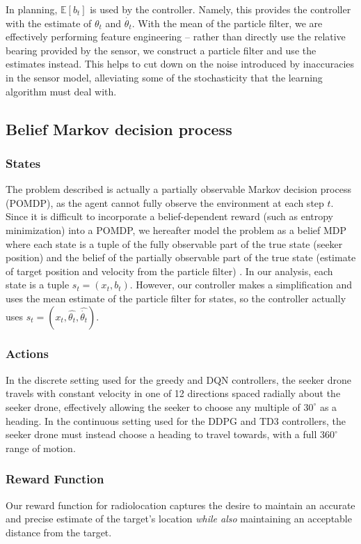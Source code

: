 \documentclass[10pt,twocolumn,letterpaper]{article}
\begin{document}
In planning, $\mathbb{E}\left [ b_t \right ]$ is used by the controller. 
Namely, this provides the controller with the estimate of $\theta_t$ and $\dot{\theta_t}$.
With the mean of the particle filter, we are effectively performing feature engineering -- rather than directly use the relative bearing provided by the sensor, we construct a particle filter and use the estimates instead.
This helps to cut down on the noise introduced by inaccuracies in the sensor model, alleviating some of the stochasticity that the learning algorithm must deal with.

\subsection{Belief Markov decision process}

\subsubsection{States}
The problem described is actually a partially observable Markov decision process (POMDP), as the agent cannot fully observe the environment at each step $t$.
Since it is difficult to incorporate a belief-dependent reward (such as entropy minimization) into a POMDP, we hereafter model the problem as a belief MDP where each state is a tuple of the fully observable part of the true state (seeker position) and the belief of the partially observable part of the true state (estimate of target position and velocity from the particle filter) \cite{dronehunter}.
In our analysis, each state is a tuple $s_t = (x_t, b_t)$.
However, our controller makes a simplification and uses the mean estimate of the particle filter for states, so the controller actually uses $s_t = (x_t, \hat{\theta_t}, \hat{\dot{\theta_t}})$.

\subsubsection{Actions}
In the discrete setting used for the greedy and DQN controllers, the seeker drone travels with constant velocity in one of 12 directions spaced radially about the seeker drone, effectively allowing the seeker to choose any multiple of $30^{\circ}$ as a heading.
In the continuous setting used for the DDPG and TD3 controllers, the seeker drone must instead choose a heading to travel towards, with a full $360^{\circ}$ range of motion.

\subsubsection{Reward Function}
Our reward function for radiolocation captures the desire to maintain an accurate and precise estimate of the target's location \textit{while also} maintaining an acceptable distance from the target.
\end{document}
